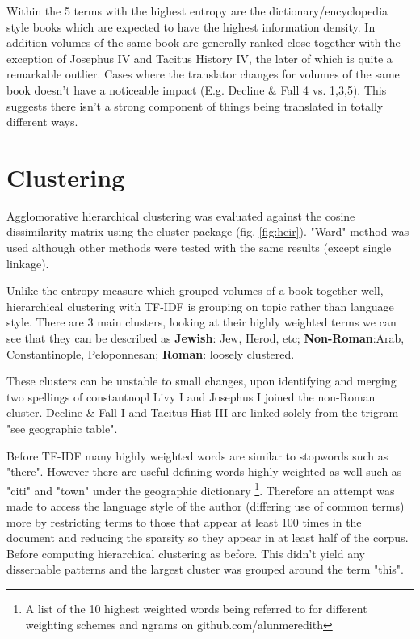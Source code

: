 \documentclass{sig-alternate-05-2015}
\begin{document}
Within the 5 terms with the highest entropy are the dictionary/encyclopedia style books which are expected to have the highest information density. In addition volumes of the same book are generally ranked close together with the exception of Josephus IV and Tacitus History IV, the later of which is quite a remarkable outlier. Cases where the translator changes for volumes of the same book doesn't have a noticeable impact (E.g. Decline \& Fall 4 vs. 1,3,5). This suggests there isn't a strong component of things being translated in totally different ways. 


\section{Clustering} 
Agglomorative hierarchical clustering was evaluated against the cosine dissimilarity matrix using the cluster package \cite{kaufmanpj}\cite{cluster}(fig. \ref{fig:heir}). "Ward" method was used although other methods were tested with the same results (except single linkage). 

Unlike the entropy measure which grouped volumes of a book together well, hierarchical clustering with TF-IDF is grouping on topic rather than language style. There are 3 main clusters, looking at their highly weighted terms we can see that they can be described as \textbf{Jewish}: Jew, Herod, etc; \textbf{Non-Roman}:Arab, Constantinople, Peloponnesan; \textbf{Roman}: loosely clustered. 

These clusters can be unstable to small changes, upon identifying and merging two spellings of constantnopl Livy I and Josephus I joined the non-Roman cluster. Decline \& Fall I and Tacitus Hist III are linked solely from the trigram "see geographic table". 

Before TF-IDF many highly weighted words are similar to stopwords such as "there". However there are useful defining words highly weighted as well such as "citi" and "town" under the geographic dictionary \footnote{A list of the 10 highest weighted words being referred to for different weighting schemes and ngrams on github.com/alunmeredith}. Therefore an attempt was made to access the language style of the author (differing use of common terms) more by restricting terms to those that appear at least 100 times in the document and reducing the sparsity so they appear in at least half of the corpus. Before computing hierarchical clustering as before. This didn't yield any dissernable patterns and the largest cluster was grouped around the term "this".
\end{document}
